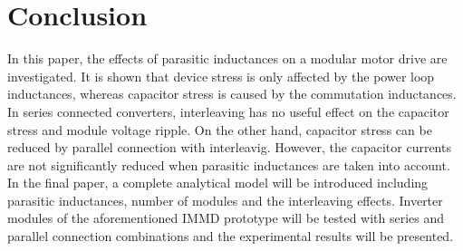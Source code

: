 \section{Conclusion}

In this paper, the effects of parasitic inductances on a modular motor drive are investigated. It is shown that device stress is only affected by the power loop inductances, whereas capacitor stress is caused by the commutation inductances. In series connected converters, interleaving has no useful effect on the capacitor stress and module voltage ripple. On the other hand, capacitor stress can be reduced by parallel connection with interleavig. However, the capacitor currents are not significantly reduced when parasitic inductances are taken into account. 
In the final paper, a complete analytical model will be introduced including parasitic inductances, number of modules and the interleaving effects. Inverter modules of the aforementioned IMMD prototype will be tested with series and parallel connection combinations and the experimental results will be presented.
